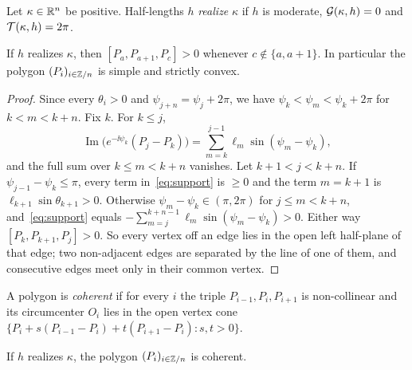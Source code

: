 \begin{definition}\label{def:realization}
Let $\kappa\in\mathbb{R}^n$ be positive. Half-lengths $h$ \emph{realize} $\kappa$ if
$h$ is moderate, $\mathcal{G}(\kappa,h)=0$ and $\mathcal{T}(\kappa,h)=2\pi$.
\end{definition}

\begin{proposition}\label{prop:convex}
If $h$ realizes $\kappa$, then $[P_a,P_{a+1},P_c]>0$ whenever
$c\notin\{a,a+1\}$. In particular the polygon $(P_i)_{i\in\mathbb{Z}/n}$ is simple and
strictly convex.
\end{proposition}

\begin{proof}
Since every $\theta_i>0$ and $\psi_{j+n}=\psi_j+2\pi$, we have
$\psi_k<\psi_m<\psi_k+2\pi$ for $k<m<k+n$. Fix $k$. For $k\le j$,
\begin{equation}\label{eq:support}
  \operatorname{Im}\bigl(e^{-\ii\psi_k}(P_j-P_k)\bigr)
  =\sum_{m=k}^{j-1}\ell_m\sin(\psi_m-\psi_k),
\end{equation}
and the full sum over $k\le m<k+n$ vanishes. Let $k+1<j<k+n$. If
$\psi_{j-1}-\psi_k\le\pi$, every term in~\eqref{eq:support} is $\ge0$ and the
term $m=k+1$ is $\ell_{k+1}\sin\theta_{k+1}>0$. Otherwise
$\psi_m-\psi_k\in(\pi,2\pi)$ for $j\le m<k+n$, and~\eqref{eq:support} equals
$-\sum_{m=j}^{k+n-1}\ell_m\sin(\psi_m-\psi_k)>0$. Either way
$[P_k,P_{k+1},P_j]>0$. So every vertex off an edge lies in the open left
half-plane of that edge; two non-adjacent edges are separated by the line of
one of them, and consecutive edges meet only in their common vertex.
\end{proof}

A polygon is \emph{coherent} if for every $i$ the triple
$P_{i-1},P_i,P_{i+1}$ is non-collinear and its circumcenter $O_i$ lies in
the open vertex cone
$\{P_i+s(P_{i-1}-P_i)+t(P_{i+1}-P_i):s,t>0\}$.

\begin{proposition}\label{prop:coherent}
If $h$ realizes $\kappa$, the polygon $(P_i)_{i\in\mathbb{Z}/n}$ is coherent.
\end{proposition}

